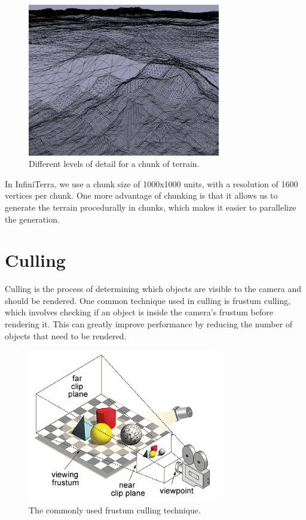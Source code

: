\documentclass{article}
\begin{document}
\begin{figure}[H]
	\centering
	\includegraphics[width=0.75\textwidth]{img/cLOD.png}
	\caption{Different levels of detail for a chunk of terrain.}
	\label{fig:clod}
\end{figure}

In InfiniTerra, we use a chunk size of 1000x1000
units, with a resolution of 1600 vertices per chunk. One more advantage of chunking is that it
allows us to generate the terrain procedurally in chunks, which makes it easier to parallelize the
generation.

\section{Culling}
Culling is the process of determining which objects are visible to the camera and should be
rendered. One common technique used in culling is frustum culling, which involves checking if an
object is inside the camera's frustum before rendering it. This can greatly improve performance by
reducing the number of objects that need to be rendered.

\begin{figure}[H]
	\centering
	\includegraphics[width=0.75\textwidth]{img/frustum.jpg}
	\caption{The commonly used frustum culling technique.}
	\label{fig:frustum}
\end{figure}
\end{document}
